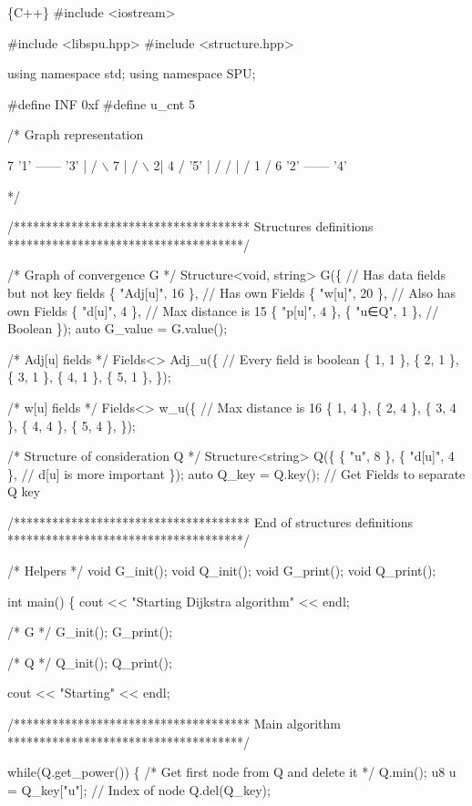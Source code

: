 \begin{DoxyCode}
\{C++\}
#include <iostream>

#include <libspu.hpp>
#include <structure.hpp>

using namespace std;
using namespace SPU;

#define INF    0xf
#define u\_cnt  5 

/* Graph representation

       7
 '1' ------ '3' 
  |        /  \(\backslash\) 7
  |      /      \(\backslash\) 
 2|   4 /       '5'
  |   /         / 
  | /   1     / 6
 '2' ------ '4'

*/

/*************************************
  Structures definitions
*************************************/

/* Graph of convergence G */
Structure<void, string> G(\{ // Has data fields but not key fields
  \{ "Adj[u]", 16 \}, // Has own Fields
  \{ "w[u]",   20 \}, // Also has own Fields
  \{ "d[u]",   4  \}, // Max distance is 15
  \{ "p[u]",   4  \},
  \{ "u∈Q",    1  \}, // Boolean
\});
auto G\_value = G.value();

/* Adj[u] fields */
Fields<> Adj\_u(\{ // Every field is boolean
  \{ 1, 1 \},
  \{ 2, 1 \},
  \{ 3, 1 \},
  \{ 4, 1 \},
  \{ 5, 1 \},
\});

/* w[u] fields */
Fields<> w\_u(\{ // Max distance is 16 
  \{ 1, 4 \},
  \{ 2, 4 \},
  \{ 3, 4 \},
  \{ 4, 4 \},
  \{ 5, 4 \},
\});

/* Structure of consideration Q */
Structure<string> Q(\{
  \{ "u",    8 \},
  \{ "d[u]", 4 \}, // d[u] is more important
\});
auto Q\_key = Q.key(); // Get Fields to separate Q key

/*************************************
  End of structures definitions
*************************************/

/* Helpers */
void G\_init();
void Q\_init();
void G\_print();
void Q\_print();

int main()
\{
  cout << "Starting Dijkstra algorithm" << endl;

  /* G */
  G\_init();
  G\_print();

  /* Q */
  Q\_init();
  Q\_print();

  cout << "Starting" << endl;

  /*************************************
    Main algorithm
  *************************************/

  while(Q.get\_power())
  \{
    /* Get first node from Q and delete it */
    Q.min();
    u8 u = Q\_key["u"]; // Index of node
    Q.del(Q\_key);


\end{DoxyCode}
